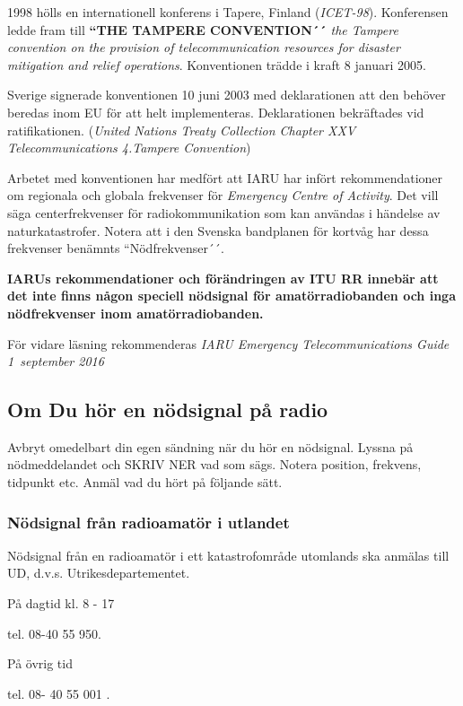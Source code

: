 1998 hölls en internationell konferens i Tapere, Finland (\emph{ICET-98}).
Konferensen ledde fram till \textbf{``THE TAMPERE CONVENTION´´} \emph{the
Tampere convention on the provision of telecommunication resources for disaster
mitigation and relief operations}. Konventionen trädde i kraft 8 januari 2005.
 
Sverige signerade konventionen 10 juni 2003 med deklarationen att den behöver beredas inom EU för att helt implementeras. Deklarationen bekräftades
vid ratifikationen. (\emph{United Nations Treaty Collection Chapter XXV Telecommunications 4.Tampere Convention})

Arbetet med konventionen har medfört att IARU har infört rekommendationer om
regionala och globala frekvenser för \emph{Emergency Centre of Activity}. Det
vill säga centerfrekvenser för radiokommunikation som kan användas i händelse
av naturkatastrofer. Notera att i den Svenska bandplanen för kortvåg har dessa
frekvenser benämnts ``Nödfrekvenser´´.

\textbf{IARUs rekommendationer och förändringen av ITU RR innebär att det inte
finns någon speciell nödsignal för amatörradiobanden och inga nödfrekvenser
inom amatörradiobanden.}   

För vidare läsning rekommenderas
\emph{IARU Emergency Telecommunications Guide 1~september 2016}

\subsection{Om Du hör en nödsignal på radio}

Avbryt omedelbart din egen sändning när du hör en nödsignal. Lyssna på
nödmeddelandet och SKRIV NER vad som sägs. Notera position, frekvens, tidpunkt
etc. Anmäl vad du hört på följande sätt.

\subsubsection{Nödsignal från radioamatör i utlandet}

Nödsignal från en radioamatör i ett katastrofområde utomlands ska anmälas till UD, d.v.s.
Utrikesdepartementet.

På dagtid kl. 8 - 17

tel. 08-40 55 950.

På övrig tid

tel. 08- 40 55 001 .


